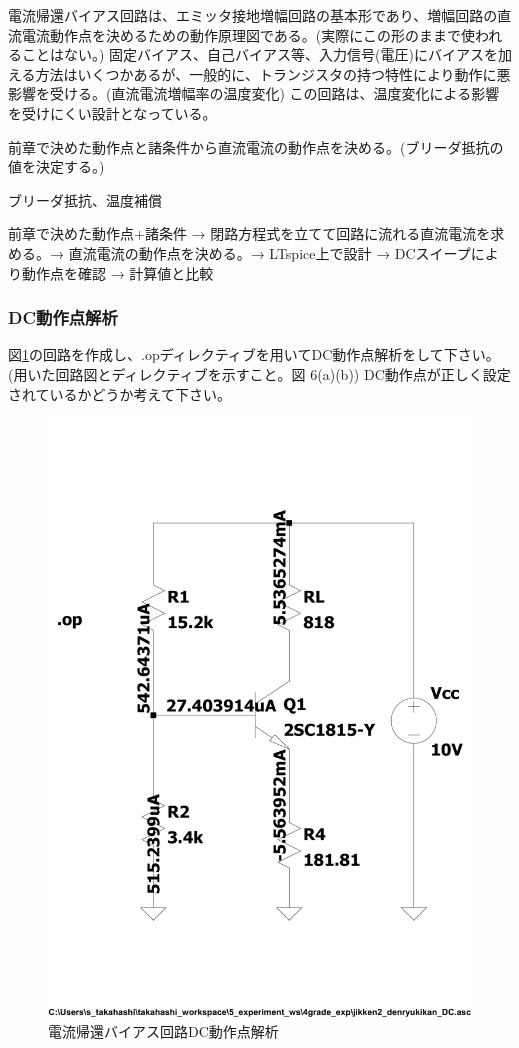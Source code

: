 電流帰還バイアス回路は、エミッタ接地増幅回路の基本形であり、増幅回路の直流電流動作点を決めるための動作原理図である。(実際にこの形のままで使われることはない。)
固定バイアス、自己バイアス等、入力信号(電圧)にバイアスを加える方法はいくつかあるが、一般的に、トランジスタの持つ特性により動作に悪影響を受ける。(直流電流増幅率の温度変化)
この回路は、温度変化による影響を受けにくい設計となっている。

\begin{description}
  \setlength{\parskip}{0cm} %
  \setlength{\itemsep}{0cm} %
  \item[ゴール] 前章で決めた動作点と諸条件から直流電流の動作点を決める。(ブリーダ抵抗の値を決定する。)
  \item[キーワード] ブリーダ抵抗、温度補償
  \item[ストーリー] 前章で決めた動作点+諸条件 → 閉路方程式を立てて回路に流れる直流電流を求める。→ 直流電流の動作点を決める。→ LTspice上で設計 → DCスイープにより動作点を確認 → 計算値と比較
\end{description}

\subsubsection{DC動作点解析}
\begin{description}
  \setlength{\parskip}{0cm} %
  \setlength{\itemsep}{0cm} %
  \item [課題7] 図\ref{current_bias_dc}の回路を作成し、.opディレクティブを用いてDC動作点解析をして下さい。(用いた回路図とディレクティブを示すこと。図 6(a)(b))
  DC動作点が正しく設定されているかどうか考えて下さい。
  \begin{figure}[htbp]
    \begin{center}
    \includegraphics[width=.5\linewidth]{img/44.pdf}
    \caption{電流帰還バイアス回路DC動作点解析}
    \label{current_bias_dc}
    \end{center}
  \end{figure}
\end{description}